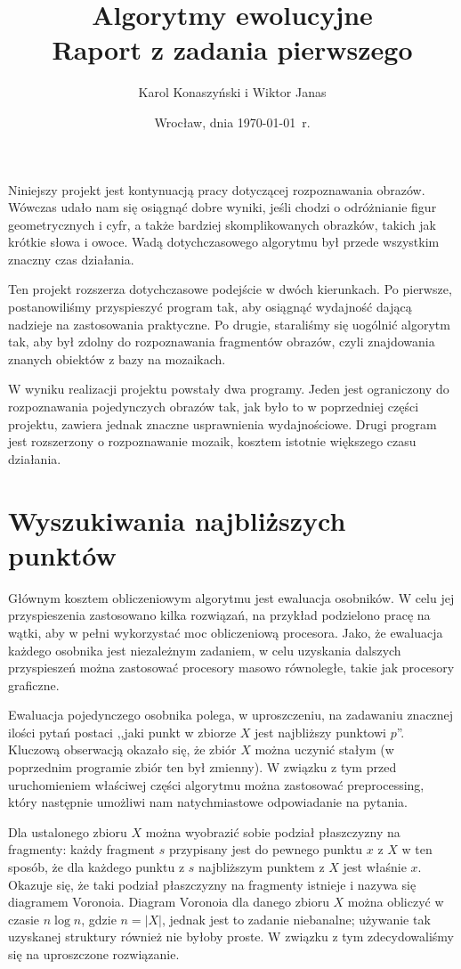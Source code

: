 \documentclass[a4paper,12pt,leqno]{article}
\title{\textbf{Algorytmy ewolucyjne}\\
       {\Large Raport z zadania pierwszego}\\[-1ex]}
\author{Karol Konaszyński i Wiktor Janas}
\date{Wrocław, dnia \today\ r.}
\begin{document}
\maketitle

Niniejszy projekt jest kontynuacją pracy dotyczącej rozpoznawania obrazów. Wówczas udało nam się osiągnąć dobre wyniki, jeśli chodzi o odróżnianie figur geometrycznych i cyfr, a także bardziej
skomplikowanych obrazków, takich jak krótkie słowa i owoce. Wadą dotychczasowego algorytmu był przede wszystkim znaczny czas działania.

Ten projekt rozszerza dotychczasowe podejście w dwóch kierunkach. Po pierwsze, postanowiliśmy przyspieszyć program tak, aby osiągnąć wydajność dającą nadzieje na zastosowania praktyczne.
Po drugie, staraliśmy się uogólnić algorytm tak, aby był zdolny do rozpoznawania fragmentów obrazów, czyli znajdowania znanych obiektów z bazy na mozaikach.

W wyniku realizacji projektu powstały dwa programy. Jeden jest ograniczony do rozpoznawania pojedynczych obrazów tak, jak było to w poprzedniej części projektu, zawiera jednak znaczne
usprawnienia wydajnościowe. Drugi program jest rozszerzony o rozpoznawanie mozaik, kosztem istotnie większego czasu działania.

\section{Wyszukiwania najbliższych punktów}

Głównym kosztem obliczeniowym algorytmu jest ewaluacja osobników. W celu jej przyspieszenia zastosowano kilka rozwiązań, na przykład podzielono pracę na wątki, aby w pełni wykorzystać 
moc obliczeniową procesora. Jako, że ewaluacja każdego osobnika jest niezależnym zadaniem, w celu uzyskania dalszych przyspieszeń można zastosować procesory masowo równoległe, takie
jak procesory graficzne. 

Ewaluacja pojedynczego osobnika polega, w uproszczeniu, na zadawaniu znacznej ilości pytań postaci ,,jaki punkt w zbiorze $X$ jest najbliższy punktowi $p$''. Kluczową obserwacją okazało
się, że zbiór $X$ można uczynić stałym (w poprzednim programie zbiór ten był zmienny). W związku z tym przed uruchomieniem właściwej części algorytmu można zastosować preprocessing,
który następnie umożliwi nam natychmiastowe odpowiadanie na pytania. 

Dla ustalonego zbioru $X$ można wyobrazić sobie podział płaszczyzny na fragmenty: każdy fragment $s$ przypisany jest do pewnego punktu $x$ z $X$ w ten sposób, że dla każdego punktu
z $s$ najbliższym punktem z $X$ jest właśnie $x$. Okazuje się, że taki podział płaszczyzny na fragmenty istnieje i nazywa się diagramem Voronoia. Diagram Voronoia dla danego zbioru
$X$ można obliczyć w czasie $n \log n$, gdzie $n = |X|$, jednak jest to zadanie niebanalne; używanie tak uzyskanej struktury również nie byłoby proste. W związku z tym zdecydowaliśmy
się na uproszczone rozwiązanie.
\end{document}
